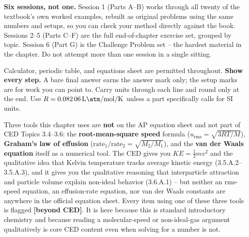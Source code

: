\documentclass{apchem-exam}
\begin{document}
\apctitleblock

\begin{apcnote}
\textbf{Six sessions, not one.} Session 1 (Parts A--B) works through all
twenty of the textbook's own worked examples, rebuilt as original problems
using the same numbers and setups, so you can check your method directly
against the book. Sessions 2--5 (Parts C--F) are the full end-of-chapter
exercise set, grouped by topic. Session 6 (Part G) is the Challenge Problem
set -- the hardest material in the chapter. Do not attempt more than one
session in a single sitting.

Calculator, periodic table, and equations sheet are permitted throughout.
\textbf{Show every step.} A bare final answer earns the answer mark only;
the setup marks are for work you can point to. Carry units through each
line and round only at the end. Use $R = \SI{0.08206}{\liter\atm\per
\mole\per\kelvin}$ unless a part specifically calls for SI units.
\end{apcnote}

\begin{apcnote}
Three tools this chapter uses are \textbf{not} on the AP equation sheet and
not part of CED Topics 3.4--3.6: the \textbf{root-mean-square speed}
formula ($u_{\text{rms}} = \sqrt{3RT/M}$), \textbf{Graham's law of
effusion} ($\text{rate}_1/\text{rate}_2 = \sqrt{M_2/M_1}$), and the
\textbf{van der Waals equation} itself as a numerical tool. The CED gives
you $KE = \tfrac12 mv^2$ and the qualitative idea that Kelvin temperature
tracks average kinetic energy (3.5.A.2--3.5.A.3), and it gives you the
qualitative reasoning that interparticle attraction and particle volume
explain non-ideal behavior (3.6.A.1) -- but neither an rms-speed equation,
an effusion-rate equation, nor van der Waals constants are anywhere in the
official equation sheet. Every item using one of these three tools is
flagged \textbf{[beyond CED]}. It is here because this is standard
introductory chemistry and because reading a molecular-speed or
non-ideal-gas argument qualitatively is core CED content even when solving
for a number is not.
\end{apcnote}

\end{document}
